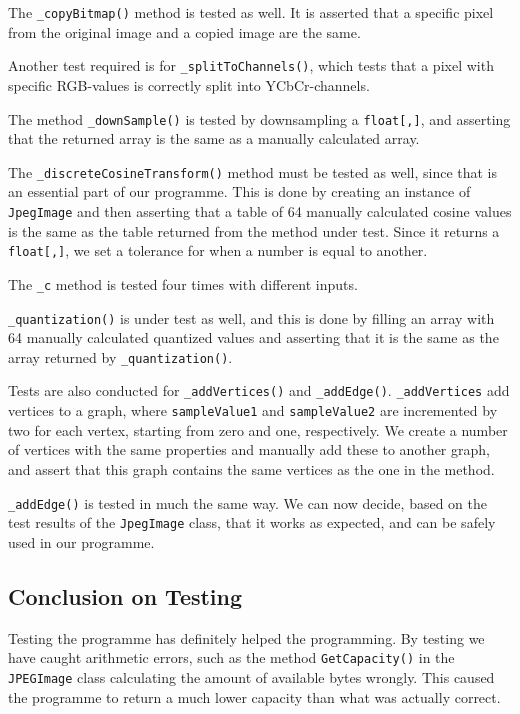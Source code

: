The \lstinline|_copyBitmap()| method is tested as well.
It is asserted that a specific pixel from the original image and a copied image are the same.

Another test required is for \lstinline|_splitToChannels()|, which tests that a pixel with specific RGB-values is correctly split into YCbCr-channels.

The method \lstinline|_downSample()| is tested by downsampling a \lstinline|float[,]|, and asserting that the returned array is the same as a manually calculated array.

The \lstinline|_discreteCosineTransform()| method must be tested as well, since that is an essential part of our programme.
This is done by creating an instance of \lstinline|JpegImage| and then asserting that a table of 64 manually calculated cosine values is the same as the table returned from the method under test.
Since it returns a \lstinline|float[,]|, we set a tolerance for when a number is equal to another.

The \lstinline|_c| method is tested four times with different inputs.

\lstinline|_quantization()| is under test as well, and this is done by filling an array with 64 manually calculated quantized values and asserting that it is the same as the array returned by \lstinline|_quantization()|.

Tests are also conducted for \lstinline|_addVertices()| and \lstinline|_addEdge()|.
\lstinline|_addVertices| add vertices to a graph, where \lstinline|sampleValue1| and \lstinline|sampleValue2| are incremented by two for each vertex, starting from zero and one, respectively.
We create a number of vertices with the same properties and manually add these to another graph, and assert that this graph contains the same vertices as the one in the method.

\lstinline|_addEdge()| is tested in much the same way.
We can now decide, based on the test results of the \lstinline|JpegImage| class, that it works as expected, and can be safely used in our programme.

\subsection{Conclusion on Testing}
Testing the programme has definitely helped the programming.
By testing we have caught arithmetic errors, such as the method \lstinline|GetCapacity()| in the \lstinline|JPEGImage| class calculating the amount of available bytes wrongly.
This caused the programme to return a much lower capacity than what was actually correct.


